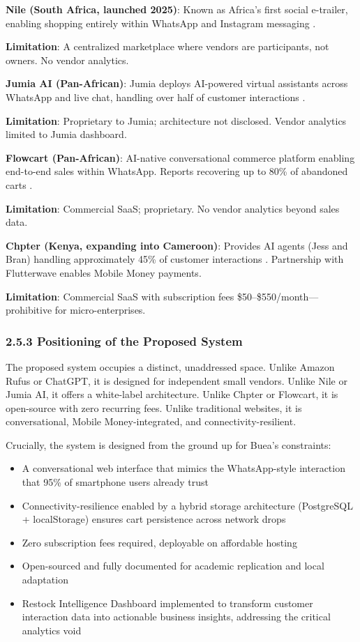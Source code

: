 \documentclass[12pt,a4paper]{article}
\begin{document}
\textbf{Nile (South Africa, launched 2025)}: Known as Africa's first social e-trailer, enabling shopping entirely within WhatsApp and Instagram messaging \citep{nile2025}.

\textbf{Limitation}: A centralized marketplace where vendors are participants, not owners. No vendor analytics.

\textbf{Jumia AI (Pan-African)}: Jumia deploys AI-powered virtual assistants across WhatsApp and live chat, handling over half of customer interactions \citep{vanguard2025}.

\textbf{Limitation}: Proprietary to Jumia; architecture not disclosed. Vendor analytics limited to Jumia dashboard.

\textbf{Flowcart (Pan-African)}: AI-native conversational commerce platform enabling end-to-end sales within WhatsApp. Reports recovering up to 80\% of abandoned carts \citep{flowcart2025}.

\textbf{Limitation}: Commercial SaaS; proprietary. No vendor analytics beyond sales data.

\textbf{Chpter (Kenya, expanding into Cameroon)}: Provides AI agents (Jess and Bran) handling approximately 45\% of customer interactions \citep{chpter2025}. Partnership with Flutterwave enables Mobile Money payments.

\textbf{Limitation}: Commercial SaaS with subscription fees \$50--\$550/month---prohibitive for micro-enterprises.

\subsubsection{2.5.3 Positioning of the Proposed System}

The proposed system occupies a distinct, unaddressed space. Unlike Amazon Rufus or ChatGPT, it is designed for independent small vendors. Unlike Nile or Jumia AI, it offers a white-label architecture. Unlike Chpter or Flowcart, it is open-source with zero recurring fees. Unlike traditional websites, it is conversational, Mobile Money-integrated, and connectivity-resilient.

Crucially, the system is designed from the ground up for Buea's constraints:

\begin{itemize}
    \item A conversational web interface that mimics the WhatsApp-style interaction that 95\% of smartphone users already trust
    \item Connectivity-resilience enabled by a hybrid storage architecture (PostgreSQL + localStorage) ensures cart persistence across network drops
    \item Zero subscription fees required, deployable on affordable hosting
    \item Open-sourced and fully documented for academic replication and local adaptation
    \item Restock Intelligence Dashboard implemented to transform customer interaction data into actionable business insights, addressing the critical analytics void
\end{itemize}
\end{document}

